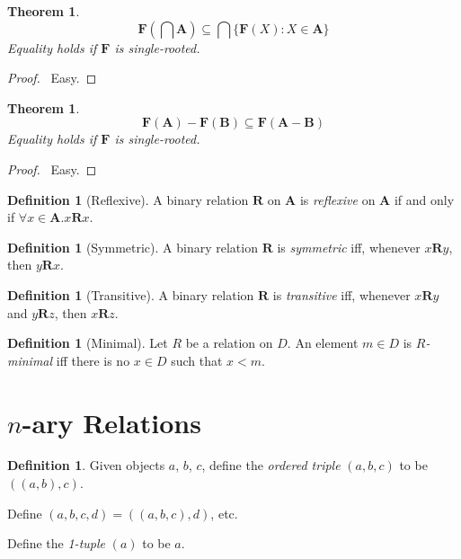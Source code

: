 \documentclass{article}
\let\qed\relax
\newtheorem{theorem}[axiom]{Theorem}
\theoremstyle{definition}
\newtheorem{definition}[axiom]{Definition}
\begin{document}
    \begin{theorem}
        \[ \mathbf{F}(\bigcap \mathbf{A}) \subseteq \bigcap \{ \mathbf{F}(X) : X \in \mathbf{A} \} \]
        Equality holds if $\mathbf{F}$ is single-rooted.
    \end{theorem}

    \begin{proof}
        \pf\ Easy. \qed
    \end{proof}

    \begin{theorem}
        \[ \mathbf{F}(\mathbf{A}) - \mathbf{F}(\mathbf{B}) \subseteq \mathbf{F}(\mathbf{A} - \mathbf{B}) \]
        Equality holds if $\mathbf{F}$ is single-rooted.
    \end{theorem}

    \begin{proof}
        \pf\ Easy. \qed
    \end{proof}

    \begin{definition}[Reflexive]
        A binary relation $\mathbf{R}$ on $\mathbf{A}$ is \emph{reflexive} on $\mathbf{A}$ if and only if
        $\forall x \in \mathbf{A}. x\mathbf{R}x$.
    \end{definition}

    \begin{definition}[Symmetric]
        A binary relation $\mathbf{R}$ is \emph{symmetric} iff, whenever $x\mathbf{R}y$, then $y\mathbf{R}x$.
    \end{definition}

    \begin{definition}[Transitive]
        A binary relation $\mathbf{R}$ is \emph{transitive} iff, whenever $x\mathbf{R}y$ and $y\mathbf{R}z$,
        then $x\mathbf{R}z$.
    \end{definition}

    \begin{definition}[Minimal]
        Let $R$ be a relation on $D$. An element $m \in D$ is \emph{$R$-minimal} iff there is no
        $x \in D$ such that $x < m$.
    \end{definition}

    \section{$n$-ary Relations}

    \begin{definition}
        Given objects $a$, $b$, $c$, define the \emph{ordered triple}
        $(a,b,c)$ to be $((a,b),c)$.

        Define $(a,b,c,d) = ((a,b,c),d)$, etc.

        Define the \emph{1-tuple} $(a)$ to be $a$.
    \end{definition}
\end{document}
